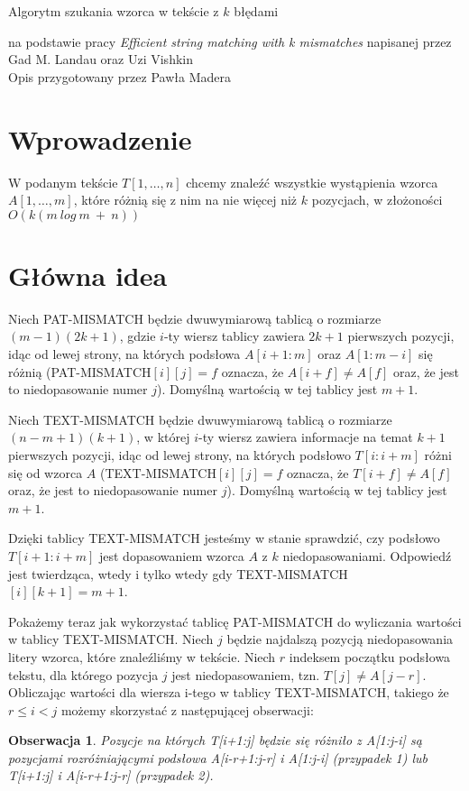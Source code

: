 \documentclass[
12pt
]{article}
\newtheorem{obs}{Obserwacja}
\theoremstyle{definition}
\theoremstyle{remark}
\begin{document}
\begin{center}
\Huge Algorytm szukania wzorca w tekście z $k$ błędami
\end{center}
\begin{center}
    na podstawie pracy \textit{Efficient string matching with k mismatches} napisanej przez  Gad M. Landau oraz Uzi Vishkin
\\
Opis przygotowany przez Pawła Madera
\end{center}


\section*{Wprowadzenie}
W podanym tekście $T[1,\dots,n]$ chcemy znaleźć wszystkie wystąpienia wzorca $A[1,\dots,m]$, które różnią się z nim na nie więcej niż $k$ pozycjach, w złożoności $O(k(m\ log\ m \ + \ n))$

\section*{Główna idea}
Niech PAT-MISMATCH będzie dwuwymiarową tablicą o rozmiarze $(m-1)(2k+1)$, gdzie 
$i$-ty wiersz tablicy zawiera $2k+1$ pierwszych pozycji, idąc od lewej strony, na których podsłowa $A[i+1:m]$ oraz $A[1:m-i]$ się różnią (PAT-MISMATCH$[i][j] = f$ oznacza, że $A[i+f] \neq A[f]$ oraz, że jest to niedopasowanie numer $j$). 
Domyślną wartością w tej tablicy jest $m+1$.

Niech TEXT-MISMATCH będzie dwuwymiarową tablicą o rozmiarze $(n-m+1)(k+1)$, w której $i$-ty wiersz zawiera informacje na temat $k+1$ pierwszych pozycji, idąc od lewej strony, na których podsłowo $T[i:i+m]$ różni się od wzorca $A$ (TEXT-MISMATCH$[i][j] = f$ oznacza, że $T[i+f] \neq A[f]$ oraz, że jest to niedopasowanie numer $j$). 
Domyślną wartością w tej tablicy jest $m+1$.

Dzięki tablicy TEXT-MISMATCH jesteśmy w stanie sprawdzić, czy podsłowo $T[i+1:i+m]$ jest dopasowaniem wzorca $A$ z $k$ niedopasowaniami.
Odpowiedź jest twierdząca, wtedy i tylko wtedy gdy TEXT-MISMATCH$[i][k+1] = m+1$. 

Pokażemy teraz jak wykorzystać tablicę PAT-MISMATCH do wyliczania wartości w tablicy TEXT-MISMATCH.
Niech $j$ będzie najdalszą pozycją niedopasowania litery wzorca, które znaleźliśmy w tekście.
Niech $r$ indeksem początku podsłowa tekstu, dla którego pozycja $j$ jest niedopasowaniem, tzn. $T[j] \neq A[j-r]$.
Obliczając wartości dla wiersza i-tego w tablicy TEXT-MISMATCH, takiego że $r\leq i < j$ możemy skorzystać z następującej obserwacji:
\begin{obs}
\label{obs_1}
Pozycje na których T[i+1:j] będzie się różniło z A[1:j-i] są pozycjami rozróżniającymi podsłowa A[i-r+1:j-r] i A[1:j-i] (przypadek 1) lub T[i+1:j] i A[i-r+1:j-r] (przypadek 2). 
\end{obs}
\end{document}
